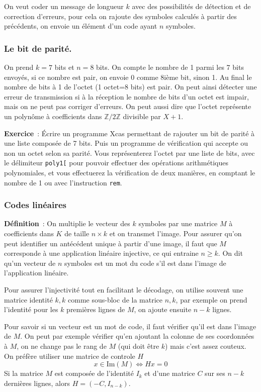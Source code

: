 \documentclass[a4paper,11pt]{article}
\newcommand{\Z}{{\mathbb{Z}}}
\begin{document}
On veut coder un message de longueur $k$ avec des possibilit\'es
de d\'etection et de correction d'erreurs, pour cela on rajoute
des symboles calcul\'es \`a partir des pr\'ec\'edents, 
on envoie un \'el\'ement d'un code ayant $n$ symboles.

\subsubsection{Le bit de parit\'e.}
On prend $k=7$ bits et $n=8$ bits. On compte
le nombre de 1 parmi les 7 bits envoy\'es, si ce nombre est pair, 
on envoie 0 comme 8i\`eme bit, sinon 1. 
Au final le nombre de bits \`a 1 de l'octet (1 octet=8 bits)
est pair. On peut ainsi d\'etecter une erreur de transmission si
\`a la r\'eception le nombre de bits d'un octet est impair, mais on
ne peut pas corriger d'erreurs.
On peut aussi dire que l'octet
repr\'esente un polyn\^ome \`a coefficients dans $\Z/2\Z$ divisible
par $X+1$.

{\bf Exercice}~:
\'Ecrire un programme Xcas permettant de rajouter un bit de parité
à une liste composée de 7 bits. Puis un programme de vérification
qui accepte ou non un octet selon sa parité. Vous représenterez
l'octet par une liste de bits, avec le délimiteur \verb|poly1[|
pour pouvoir effectuer des opérations arithmétiques polynomiales,
et vous effectuerez la vérification de deux manières, en comptant
le nombre de 1 ou avec l'instruction \verb|rem|.

\subsubsection{Codes lin\'eaires}
{\bf D\'efinition}~:
On multiplie le vecteur des $k$ symboles par
une matrice $M$ à coefficients dans $K$ de taille $n \times k$
et on transmet l'image.
Pour assurer qu'on peut identifier un antécédent
unique à partir d'une image, il faut que $M$ corresponde 
à une application linéaire injective, ce qui entraine $n\geq k$. 
On dit qu'un vecteur de $n$ symboles est un mot du code 
s'il est dans l'image de l'application lin\'eaire.

Pour assurer l'injectivité tout en facilitant le décodage, 
on utilise souvent une matrice identité $k,k$ comme sous-bloc
de la matrice $n,k$, par exemple on prend l'identité pour
les $k$ premières lignes de $M$, on ajoute ensuite $n-k$ lignes.

Pour savoir si un vecteur est un mot de code, il faut vérifier
qu'il est dans l'image de $M$. On peut par exemple vérifier
qu'en ajoutant la colonne de ses coordonnées à $M$, on ne change
pas le rang de $M$ (qui doit être $k$) mais c'est assez couteux.
On pr\'ef\`ere utiliser une matrice de controle $H$
$$ x \in \mbox{Im}(M) \Leftrightarrow Hx=0$$
Si la matrice $M$ est compos\'ee de l'identit\'e $I_{k}$
et d'une matrice $C$ sur ses $n-k$ derni\`eres lignes, 
alors $H=(-C,I_{n-k})$.
\end{document}
